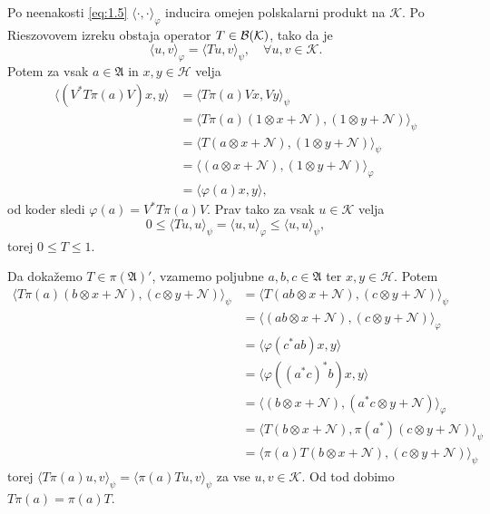 \begin{dokaz}
    Po neenakosti \eqref{eq:1.5} $\langle \cdot, \cdot \rangle_\varphi$ inducira omejen polskalarni produkt na $\mathcal{K}$.
    Po Rieszovovem izreku obstaja operator $T \in \operatorname{\mathcal{B} (\mathcal{K})}$, tako da je
    $$\langle u, v \rangle_{\varphi} = \langle T u, v \rangle_{\psi},\quad \forall u, v \in \mathcal{K}.$$
    Potem za vsak $a \in \mathfrak{A}$ in $x, y \in \mathcal{H}$ velja
    \begin{align*}
        \langle (V^* T \pi(a) V) x, y\rangle &= \langle T \pi(a) V x, V y\rangle_{\psi}\\
        &= \langle T \pi(a) (1 \otimes x + \mathcal{N}), (1 \otimes y + \mathcal{N}) \rangle _{\psi}\\
        &= \langle T (a \otimes x + \mathcal{N}), (1 \otimes y + \mathcal{N}) \rangle _{\psi}\\
        &= \langle (a \otimes x + \mathcal{N}), (1 \otimes y + \mathcal{N}) \rangle _{\varphi}\\
        &= \langle \varphi (a) x, y \rangle,
    \end{align*}
    od koder sledi $\varphi(a) = V^* T \pi(a) V$. Prav tako za vsak $u \in \mathcal{K}$ velja
    $$0 \leq \langle T u, u \rangle_{\psi} = \langle u, u \rangle_{\varphi} \leq \langle u, u \rangle_{\psi},$$
    torej $0 \leq T \leq 1$. 
    
    Da dokažemo $T \in \pi(\mathfrak{A})'$, vzamemo poljubne $a, b, c \in \mathfrak{A}$ ter $x, y \in \mathcal{H}$.
    Potem \begin{align*}
        \langle T \pi(a) (b \otimes x + \mathcal{N}), (c \otimes y + \mathcal{N}) \rangle_\psi &= \langle T (ab \otimes x + \mathcal{N}), (c \otimes y + \mathcal{N}) \rangle_\psi\\
        &= \langle (ab \otimes x + \mathcal{N}), (c \otimes y + \mathcal{N}) \rangle_\varphi\\
        &= \langle \varphi (c^* ab)x, y\rangle\\
        &= \langle \varphi ((a^* c)^* b)x, y \rangle\\
        &= \langle (b \otimes x + \mathcal{N}), (a^* c \otimes y + \mathcal{N}) \rangle_\varphi\\
        &= \langle T (b \otimes x + \mathcal{N}), \pi(a^*) (c \otimes y + \mathcal{N}) \rangle_{\psi}\\
        &= \langle\pi(a) T  (b \otimes x + \mathcal{N}), (c \otimes y + \mathcal{N}) \rangle_\psi     
    \end{align*}
    torej $\langle T \pi(a) u, v \rangle_{\psi} = \langle \pi(a) T u, v \rangle_{\psi}$ za vse $u, v \in \mathcal{K}$. Od tod dobimo $T \pi(a) = \pi(a) T$.


\end{dokaz}
